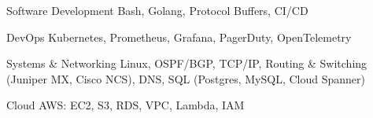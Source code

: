 

\begin{cvskills}

  \cvskill
    {Software Development} %
    {Bash, Golang, Protocol Buffers, CI/CD} %

  \cvskill
    {DevOps} %
    {Kubernetes, Prometheus, Grafana, PagerDuty, OpenTelemetry} %

  \cvskill
    {Systems \& Networking} %
    {Linux, OSPF/BGP, TCP/IP, Routing \& Switching (Juniper MX, Cisco NCS), DNS, SQL (Postgres, MySQL, Cloud Spanner)} %


  \cvskill
    {Cloud} %
    {AWS: EC2, S3, RDS, VPC, Lambda, IAM} %

\end{cvskills}
